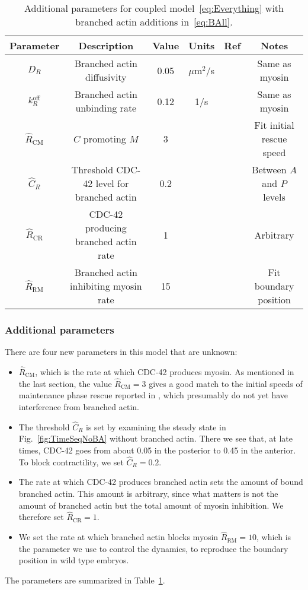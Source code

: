 \documentclass[11pt]{article}
\newcommand{\6}[1]{#1_{\text{6}}}
\newcommand{\3}[1]{#1_{\text{3}}}
\begin{document}
\begin{table}
\begin{small}
\centering
\begin{tabular}{|c|c|c|c|c|c|}\hline
Parameter & Description & Value & Units & Ref & Notes \\ \hline
$D_R$ & Branched actin diffusivity & 0.05 & $\mu$m$^2$/s & & Same as myosin \\
$k^\text{off}_R$ & Branched actin unbinding rate & 0.12 & 1/s & & Same as myosin \\ \hline
$\hat R_\text{CM}$ & $C$ promoting $M$ & 3 & &  \cite[Fig.~7D]{tse2012rhoa} & Fit initial rescue speed\\ 
$\hat C_R$ & Threshold CDC-42 level for branched actin & 0.2 & & & Between $A$ and $P$ levels\\
$\hat R_\text{CR}$ & CDC-42 producing branched actin rate  & 1 & & & Arbitrary\\ 
$\hat R_\text{RM}$ & Branched actin inhibiting myosin rate & 15 & & & Fit boundary position\\  \hline
\end{tabular}
\caption{\label{tab:paramsBR} Additional parameters for coupled model\ \eqref{eq:Everything} with branched actin additions in\ \eqref{eq:BAll}.}
\end{small}
\end{table}


\subsubsection{Additional parameters}
There are four new parameters in this model that are unknown: 
\begin{itemize}
\item $\hat{R}_\text{CM}$, which is the rate at which CDC-42 produces myosin. As mentioned in the last section, the value $\hat R_\text{CM}=3$ gives a good match to the initial speeds of maintenance phase rescue reported in \cite[Fig.~7D]{tse2012rhoa}, which presumably do not yet have interference from branched actin.
\item The threshold $\hat C_R$ is set by examining the steady state in Fig.\ \ref{fig:TimeSeqNoBA} without branched actin. There we see that, at late times, CDC-42 goes from about 0.05 in the posterior to 0.45 in the anterior. To block contractility, we set $\hat C_R=0.2$. 
\item The rate at which CDC-42 produces branched actin sets the amount of bound branched actin. This amount is arbitrary, since what matters is not the amount of branched actin but the total amount of myosin inhibition. We therefore set $\hat R_\text{CR}=1$.
\item We set the rate at which branched actin blocks myosin $\hat R_\text{RM}=10$, which is the parameter we use to control the dynamics, to reproduce the boundary position in wild type embryos. 
\end{itemize}
The parameters are summarized in Table\ \ref{tab:paramsBR}. 
\end{document}
